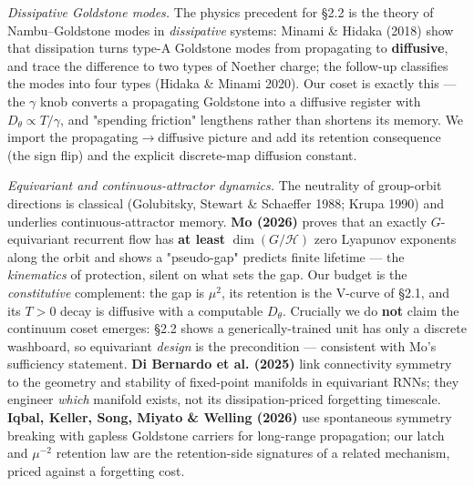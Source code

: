 \documentclass{article}
\begin{document}
\emph{Dissipative Goldstone modes.} The physics precedent for \S 2.2 is the theory of Nambu--Goldstone modes in \emph{dissipative} systems: Minami \& Hidaka (2018) show that dissipation turns type-A Goldstone modes from propagating to \textbf{diffusive}, and trace the difference to two types of Noether charge; the follow-up classifies the modes into four types (Hidaka \& Minami 2020). Our coset is exactly this --- the $\gamma$ knob converts a propagating Goldstone into a diffusive register with $D_\theta\propto T/\gamma$, and "spending friction" lengthens rather than shortens its memory. We import the propagating$\to$diffusive picture and add its retention consequence (the sign flip) and the explicit discrete-map diffusion constant.

\emph{Equivariant and continuous-attractor dynamics.} The neutrality of group-orbit directions is classical (Golubitsky, Stewart \& Schaeffer 1988; Krupa 1990) and underlies continuous-attractor memory. \textbf{Mo (2026)} proves that an exactly $G$-equivariant recurrent flow has \textbf{at least} $\dim(G/\mathcal H)$ zero Lyapunov exponents along the orbit and shows a "pseudo-gap" predicts finite lifetime --- the \emph{kinematics} of protection, silent on what sets the gap. Our budget is the \emph{constitutive} complement: the gap is $\mu^2$, its retention is the V-curve of \S 2.1, and its $T>0$ decay is diffusive with a computable $D_\theta$. Crucially we do \textbf{not} claim the continuum coset emerges: \S 2.2 shows a generically-trained unit has only a discrete washboard, so equivariant \emph{design} is the precondition --- consistent with Mo's sufficiency statement. \textbf{Di Bernardo et al. (2025)} link connectivity symmetry to the geometry and stability of fixed-point manifolds in equivariant RNNs; they engineer \emph{which} manifold exists, not its dissipation-priced forgetting timescale. \textbf{Iqbal, Keller, Song, Miyato \& Welling (2026)} use spontaneous symmetry breaking with gapless Goldstone carriers for long-range propagation; our latch and $\mu^{-2}$ retention law are the retention-side signatures of a related mechanism, priced against a forgetting cost.
\end{document}

